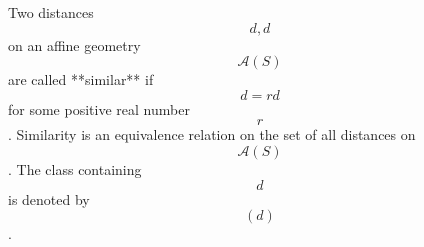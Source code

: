 Two distances $$d, d$$ on an affine geometry $$\mathcal{A}(S)$$ are called **similar** if $$d = rd$$ for some positive real number $$r$$.
Similarity is an equivalence relation on the set of all distances on $$\mathcal{A}(S)$$. The class containing $$d$$ is denoted by $$(d)$$.
